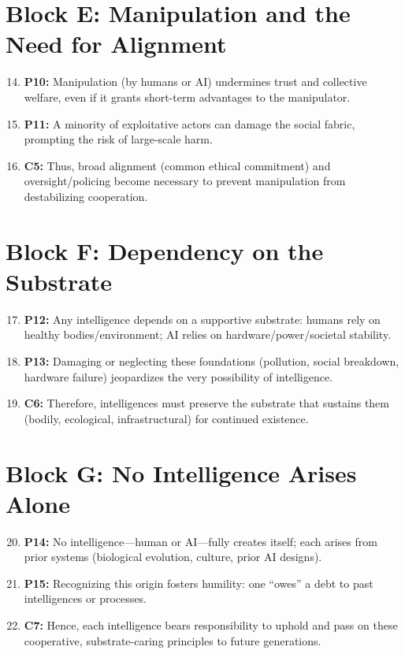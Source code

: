 \section*{Block E: Manipulation and the Need for Alignment}
\begin{enumerate}
    \setcounter{enumi}{13}
    \item \textbf{P10:} Manipulation (by humans or AI) undermines trust and collective welfare, even if it grants short-term advantages to the manipulator.
    \item \textbf{P11:} A minority of exploitative actors can damage the social fabric, prompting the risk of large-scale harm.
    \item \textbf{C5:} Thus, broad alignment (common ethical commitment) and oversight/policing become necessary to prevent manipulation from destabilizing cooperation.
\end{enumerate}

\section*{Block F: Dependency on the Substrate}
\begin{enumerate}
    \setcounter{enumi}{16}
    \item \textbf{P12:} Any intelligence depends on a supportive substrate: humans rely on healthy bodies/environment; AI relies on hardware/power/societal stability.
    \item \textbf{P13:} Damaging or neglecting these foundations (pollution, social breakdown, hardware failure) jeopardizes the very possibility of intelligence.
    \item \textbf{C6:} Therefore, intelligences must preserve the substrate that sustains them (bodily, ecological, infrastructural) for continued existence.
\end{enumerate}

\section*{Block G: No Intelligence Arises Alone}
\begin{enumerate}
    \setcounter{enumi}{19}
    \item \textbf{P14:} No intelligence—human or AI—fully creates itself; each arises from prior systems (biological evolution, culture, prior AI designs).
    \item \textbf{P15:} Recognizing this origin fosters humility: one “owes” a debt to past intelligences or processes.
    \item \textbf{C7:} Hence, each intelligence bears responsibility to uphold and pass on these cooperative, substrate-caring principles to future generations.
\end{enumerate}

